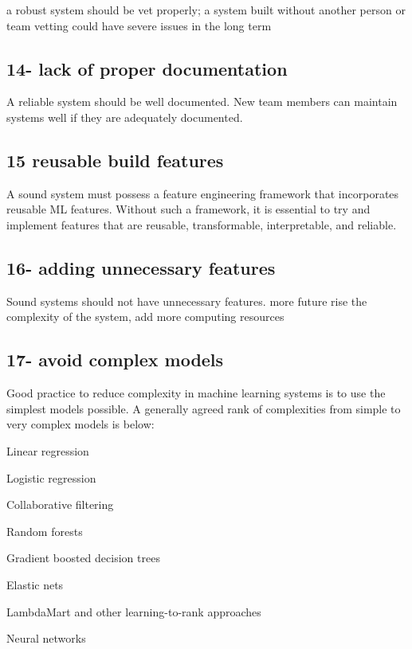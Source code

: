 \documentclass[]{article}
\begin{document}
a robust system should be vet properly; a system built without another
person or team vetting could have severe issues in the long term

\subsection{14- lack of proper
documentation}\label{lack-of-proper-documentation}

A reliable system should be well documented. New team members can
maintain systems well if they are adequately documented.

\subsection{15 reusable build features}\label{reusable-build-features}

A sound system must possess a feature engineering framework that
incorporates reusable ML features. Without such a framework, it is
essential to try and implement features that are reusable,
transformable, interpretable, and reliable.

\subsection{16- adding unnecessary
features}\label{adding-unnecessary-features}

Sound systems should not have unnecessary features. more future rise the
complexity of the system, add more computing resources

\subsection{17- avoid complex models}\label{avoid-complex-models}

Good practice to reduce complexity in machine learning systems is to use
the simplest models possible. A generally agreed rank of complexities
from simple to very complex models is below:

Linear regression

Logistic regression

Collaborative filtering

Random forests

Gradient boosted decision trees

Elastic nets

LambdaMart and other learning-to-rank approaches

Neural networks
\end{document}
